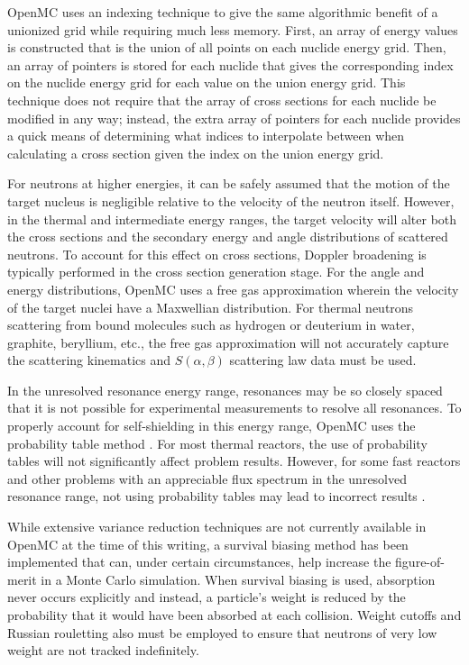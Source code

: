 \documentclass[authoryear,preprint]{elsarticle}
\begin{document}
OpenMC uses an indexing technique to give the same algorithmic benefit of a
unionized grid while requiring much less memory. First, an array of energy
values is constructed that is the union of all points on each nuclide energy
grid. Then, an array of pointers is stored for each nuclide that gives the
corresponding index on the nuclide energy grid for each value on the union
energy grid. This technique does not require that the array of cross sections
for each nuclide be modified in any way; instead, the extra array of pointers
for each nuclide provides a quick means of determining what indices to
interpolate between when calculating a cross section given the index on the
union energy grid.

For neutrons at higher energies, it can be safely assumed that the motion of the
target nucleus is negligible relative to the velocity of the neutron
itself. However, in the thermal and intermediate energy ranges, the target
velocity will alter both the cross sections and the secondary energy and angle
distributions of scattered neutrons. To account for this effect on cross
sections, Doppler broadening is typically performed in the cross section
generation stage. For the angle and energy distributions, OpenMC uses a free gas
approximation \citep{freegas} wherein the velocity of the target nuclei have a
Maxwellian distribution. For thermal neutrons scattering from bound molecules
such as hydrogen or deuterium in water, graphite, beryllium, etc., the free gas
approximation will not accurately capture the scattering kinematics and
$S(\alpha,\beta)$ scattering law data must be used.

In the unresolved resonance energy range, resonances may be so closely spaced
that it is not possible for experimental measurements to resolve all
resonances. To properly account for self-shielding in this energy range, OpenMC
uses the probability table method \citep{probtables}. For most thermal reactors,
the use of probability tables will not significantly affect problem
results. However, for some fast reactors and other problems with an appreciable
flux spectrum in the unresolved resonance range, not using probability tables
may lead to incorrect results \citep{probtables-testing}.

While extensive variance reduction techniques are not currently available in
OpenMC at the time of this writing, a survival biasing method has been
implemented that can, under certain circumstances, help increase the
figure-of-merit in a Monte Carlo simulation. When survival biasing is used,
absorption never occurs explicitly and instead, a particle's weight is reduced
by the probability that it would have been absorbed at each collision. Weight
cutoffs and Russian rouletting also must be employed to ensure that neutrons of
very low weight are not tracked indefinitely.
\end{document}
